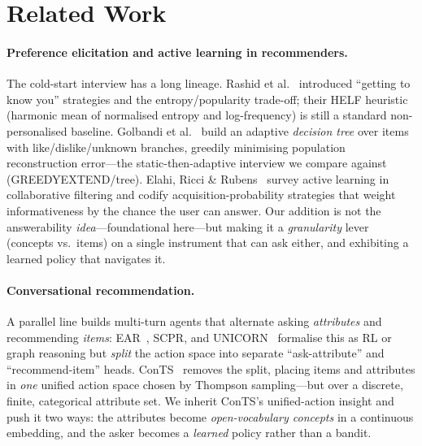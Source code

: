 \documentclass[11pt]{article}
\begin{document}
\section{Related Work}\label{sec:related}
\paragraph{Preference elicitation and active learning in recommenders.} The cold-start interview has a
long lineage. Rashid et al.~\cite{rashid} introduced ``getting to know you'' strategies and the
entropy/popularity trade-off; their HELF heuristic (harmonic mean of normalised entropy and
log-frequency) is still a standard non-personalised baseline. Golbandi et al.~\cite{golbandi11} build an
adaptive \emph{decision tree} over items with like/dislike/unknown branches, greedily minimising
population reconstruction error---the static-then-adaptive interview we compare against
(GREEDYEXTEND/tree). Elahi, Ricci \& Rubens~\cite{elahi16} survey active learning in collaborative
filtering and codify acquisition-probability strategies that weight informativeness by the chance the
user can answer. Our addition is not the answerability \emph{idea}---foundational here---but making it a
\emph{granularity} lever (concepts vs.\ items) on a single instrument that can ask either, and exhibiting
a learned policy that navigates it.

\paragraph{Conversational recommendation.} A parallel line builds multi-turn agents that alternate asking
\emph{attributes} and recommending \emph{items}: EAR~\cite{ear}, SCPR, and UNICORN~\cite{unicorn}
formalise this as RL or graph reasoning but \emph{split} the action space into separate ``ask-attribute''
and ``recommend-item'' heads. ConTS~\cite{conts} removes the split, placing items and attributes in
\emph{one} unified action space chosen by Thompson sampling---but over a discrete, finite, categorical
attribute set. We inherit ConTS's unified-action insight and push it two ways: the attributes become
\emph{open-vocabulary concepts} in a continuous embedding, and the asker becomes a \emph{learned} policy
rather than a bandit.
\end{document}
